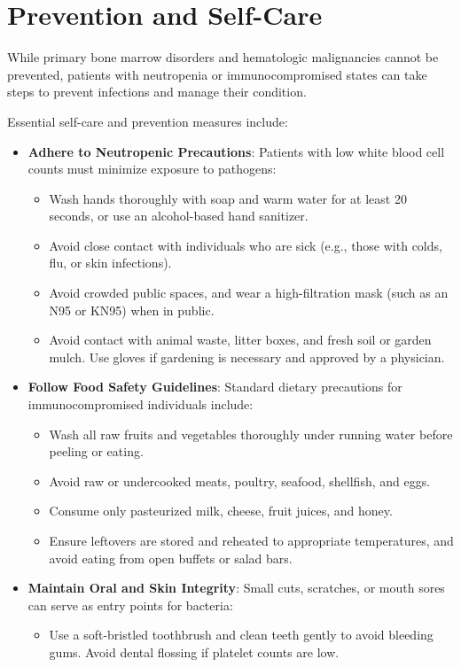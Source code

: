 \section*{Prevention and Self-Care}
While primary bone marrow disorders and hematologic malignancies cannot be prevented, patients with neutropenia or immunocompromised states can take steps to prevent infections and manage their condition.

Essential self-care and prevention measures include:
\begin{itemize}
  \item \textbf{Adhere to Neutropenic Precautions}: Patients with low white blood cell counts must minimize exposure to pathogens:
    \begin{itemize}
      \item Wash hands thoroughly with soap and warm water for at least 20 seconds, or use an alcohol-based hand sanitizer.
      \item Avoid close contact with individuals who are sick (e.g., those with colds, flu, or skin infections).
      \item Avoid crowded public spaces, and wear a high-filtration mask (such as an N95 or KN95) when in public.
      \item Avoid contact with animal waste, litter boxes, and fresh soil or garden mulch. Use gloves if gardening is necessary and approved by a physician.
    \end{itemize}
  \item \textbf{Follow Food Safety Guidelines}: Standard dietary precautions for immunocompromised individuals include:
    \begin{itemize}
      \item Wash all raw fruits and vegetables thoroughly under running water before peeling or eating.
      \item Avoid raw or undercooked meats, poultry, seafood, shellfish, and eggs.
      \item Consume only pasteurized milk, cheese, fruit juices, and honey.
      \item Ensure leftovers are stored and reheated to appropriate temperatures, and avoid eating from open buffets or salad bars.
    \end{itemize}
  \item \textbf{Maintain Oral and Skin Integrity}: Small cuts, scratches, or mouth sores can serve as entry points for bacteria:
    \begin{itemize}
      \item Use a soft-bristled toothbrush and clean teeth gently to avoid bleeding gums. Avoid dental flossing if platelet counts are low.

\end{itemize}
\end{itemize}
